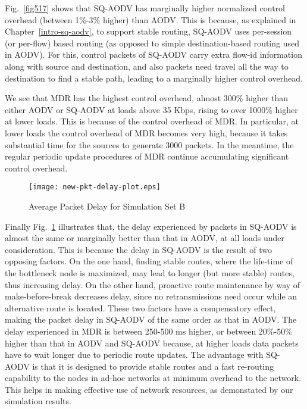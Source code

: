 Fig.~\ref{fig517} shows that SQ-AODV has marginally higher normalized control overhead (between 1\%-3\% higher) than AODV. This is because, as explained in Chapter~\ref{intro-sq-aodv}, to support stable routing, SQ-AODV uses per-session (or per-flow) based routing (as opposed to simple destination-based routing used in AODV). For this, control packets of SQ-AODV carry extra flow-id information along with source and destination, and also packets need travel all the way to destination to find a stable path, leading to a marginally higher control overhead.

We see that MDR has the highest control overhead, almost 300\% higher than either AODV or SQ-AODV at loads above 35 Kbps, rising to over 1000\% higher at lower loads. This is because of the control overhead of MDR. In particular,
at lower loads the control overhead of MDR becomes very high, because it takes substantial time for the sources to generate 3000 packets. In the meantime, the regular  periodic update procedures of MDR continue accumulating significant control overhead.

\begin{figure}[htbp]
	\centering
	\texttt{[image: new-pkt-delay-plot.eps]}
	\caption{Average Packet Delay for Simulation Set B}
	\label{fig518}
\end{figure}

Finally Fig.~\ref{fig518} illustrates that, the delay experienced by packets in SQ-AODV is almost the same or marginally better than that in AODV, at all loads under consideration. This is because the delay in SQ-AODV is the result of two opposing factors. On the one hand, finding stable routes, where the life-time of the bottleneck node is maximized, may lead to longer (but more stable) routes, thus increasing delay. On the other hand, proactive route maintenance by way of make-before-break decreases delay, since no retransmissions need occur while an alternative route is located. These two factors have a compensatory effect, making the packet delay in SQ-AODV of the same order as that in AODV. The delay experienced in MDR is between 250-500 ms higher, or between 20\%-50\% higher than that in AODV and SQ-AODV because, at higher loads data packets have to wait longer due to periodic route updates.
The advantage with SQ-AODV is that it is designed to provide stable routes and a fast re-routing capability to the nodes in ad-hoc networks at minimum overhead to the network. This helps in making effective use of network resources, as demonstated by our simulation results.

